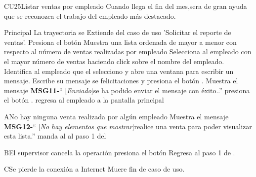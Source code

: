 \begin{UseCase}{CU25}{Listar ventas por empleado}{
	Cuando llega el fin del mes,sera de gran ayuda que se reconozca el trabajo
	del empleado más destacado.
	}
	\end{UseCase}
	\begin{UCtrayectoria}{Principal}
		\UCpaso La trayectoria se Extiende del caso de uso 'Solicitar el reporte de ventas'.
		\UCpaso [\UCactor] Presiona el botón 
		\UCpaso Muestra una lista ordenada de mayor a menor con respecto al número de ventas realizadas por empleado
		\UCpaso[\UCactor] Selecciona al empleado con el mayor número de ventas haciendo click sobre el nombre del empleado.
		\UCpaso Identifica al empleado que el \UCactor selecciono y abre una ventana para escribir un mensaje.
		\UCpaso [\UCactor] Escribe su mensaje se felicitaciones y presiona el botón .
		\UCpaso Muestra el mensaje {\bf MSG11-}`` [{\em Enviado}]se ha podido enviar el mensaje con éxito..''
		\UCpaso [\UCactor] presiona el botón .
		\UCpaso regresa al empleado a la pantalla principal 
		
	\end{UCtrayectoria}

\begin{UCtrayectoriaA}{A}{No hay ninguna venta realizada por algún empleado}
			\UCpaso Muestra el mensaje {\bf MSG12-}`` [{\em No hay elementos que mostrar}]realice una venta para poder visualizar esta lista.''
			\UCpaso manda al \UCactor al paso 1 del 
		\end{UCtrayectoriaA}	
\begin{UCtrayectoriaA}{B}{El supervisor cancela la operación }
			\UCpaso [\UCactor] presiona el botón 
			\UCpaso Regresa al paso 1 de .
		\end{UCtrayectoriaA}				
		
\begin{UCtrayectoriaA}{C}{Se pierde la conexión a Internet}
			\UCpaso Muere
			\UCpaso fin de caso de uso.
		\end{UCtrayectoriaA}				


